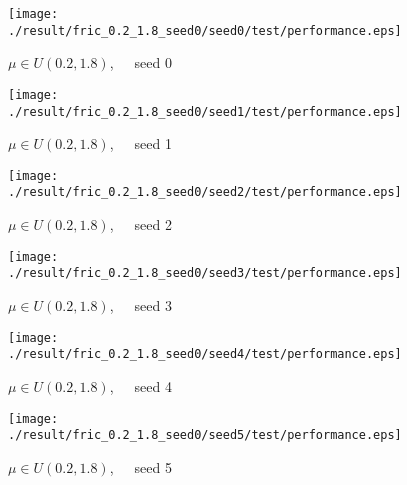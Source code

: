 \begin{figure}[p]
 \begin{minipage}{0.49\hsize}
  \begin{center}
 \texttt{[image: ./result/fric\_0.2\_1.8\_seed0/seed0/test/performance.eps]}
  \caption{$\mu\in U(0.2,1.8)$,~~~seed 0
  }
  \end{center}
 \end{minipage}
 \begin{minipage}{0.49\hsize}
   \begin{center}
 \texttt{[image: ./result/fric\_0.2\_1.8\_seed0/seed1/test/performance.eps]}
  \caption{$\mu\in U(0.2,1.8)$,~~~seed 1
  }
  \end{center}
 \end{minipage}
\end{figure}

\begin{figure}[p]
 \begin{minipage}{0.49\hsize}
  \begin{center}
 \texttt{[image: ./result/fric\_0.2\_1.8\_seed0/seed2/test/performance.eps]}
  \caption{$\mu\in U(0.2,1.8)$,~~~seed 2
  }
  \end{center}
 \end{minipage}
 \begin{minipage}{0.49\hsize}
   \begin{center}
 \texttt{[image: ./result/fric\_0.2\_1.8\_seed0/seed3/test/performance.eps]}
  \caption{$\mu\in U(0.2,1.8)$,~~~seed 3
  }
  \end{center}
 \end{minipage}
\end{figure}

\begin{figure}[p]
 \begin{minipage}{0.49\hsize}
  \begin{center}
 \texttt{[image: ./result/fric\_0.2\_1.8\_seed0/seed4/test/performance.eps]}
  \caption{$\mu\in U(0.2,1.8)$,~~~seed 4
  }
  \end{center}
 \end{minipage}
 \begin{minipage}{0.49\hsize}
   \begin{center}
 \texttt{[image: ./result/fric\_0.2\_1.8\_seed0/seed5/test/performance.eps]}
  \caption{$\mu\in U(0.2,1.8)$,~~~seed 5
  }
  \end{center}
 \end{minipage}
\end{figure}
